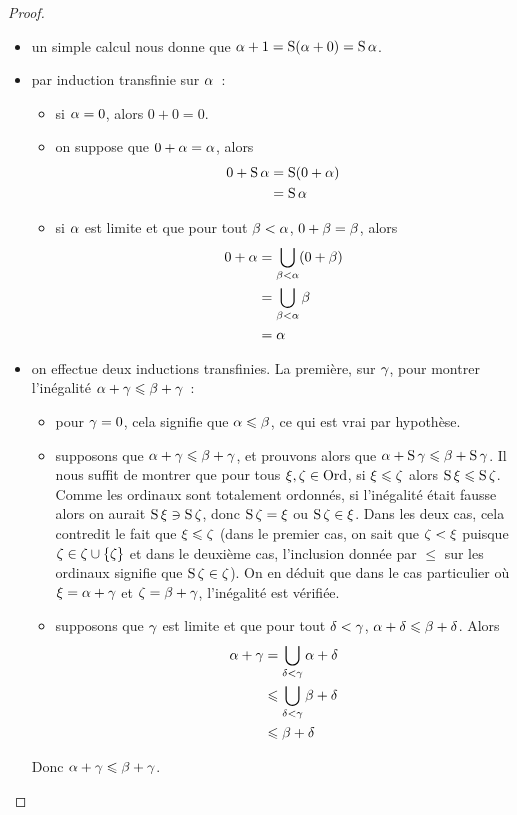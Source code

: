 \begin{proof}
\begin{itemize}
    Par contraposée, si $n \in \Ow$, alors $1 + n = n + 1 = \Ss n \neq n$,
    donc $1 + \varOa = \varOa \implies \Ow \leq \varOa$.
  \item un simple calcul nous donne que
    $\alpha + 1 = \operatorname{S}(\alpha + 0) = \operatorname{S}\alpha$.
  \item par induction transfinie sur $\alpha$~:
    \begin{itemize}
    \item si $\alpha = 0$, alors $0 + 0 = 0$.
    \item on suppose que $0 + \alpha= \alpha$, alors
      \begin{align*}
        0 + \operatorname{S}\alpha &= \operatorname{S}(0+\alpha) \\
        &= \operatorname{S}\alpha
      \end{align*}
    \item si $\alpha$ est limite et que pour tout $\beta < \alpha$,
      $0 + \beta = \beta$, alors
      \begin{align*}
        0 + \alpha &= \bigcup_{\beta < \alpha} (0 + \beta)\\
        &= \bigcup_{\beta < \alpha} \beta \\
        &= \alpha
      \end{align*}
    \end{itemize}
  \item on effectue deux inductions transfinies. La première, sur $\gamma$, pour
    montrer l'inégalité $\alpha + \gamma \leqslant \beta + \gamma$~:
    \begin{itemize}
    \item pour $\gamma = 0$, cela signifie que $\alpha \leqslant \beta$, ce qui est
      vrai par hypothèse.
    \item supposons que $\alpha + \gamma \leqslant \beta + \gamma$, et prouvons
      alors que $\alpha + \operatorname{S}\gamma \leqslant \beta + \operatorname{S}\gamma$. Il nous suffit de
      montrer que pour tous $\xi,\zeta\in\operatorname{Ord}$, si $\xi \leqslant \zeta$
      alors $\operatorname{S}\xi\leqslant\operatorname{S}\zeta$. Comme les ordinaux sont totalement
      ordonnés, si l'inégalité était fausse alors on aurait
      $\operatorname{S}\xi\ni\operatorname{S}\zeta$, donc $\operatorname{S}\zeta = \xi$ ou
      $\operatorname{S}\zeta\in \xi$. Dans les deux cas, cela contredit
      le fait que $\xi \leqslant \zeta$ (dans le premier cas, on sait que
      $\zeta < \xi$ puisque $\zeta \in \zeta \cup \{\zeta\}$ et dans le
      deuxième cas, l'inclusion donnée par $\leq$ sur les ordinaux signifie que
      $\operatorname{S}\zeta \in \zeta$). On en déduit que dans le cas particulier où
      $\xi = \alpha + \gamma$ et $\zeta = \beta + \gamma$, l'inégalité est
      vérifiée.
    \item supposons que $\gamma$ est limite et que pour tout $\delta < \gamma$,
      $\alpha + \delta \leqslant \beta + \delta$. Alors
      \begin{align*}
        \alpha + \gamma &= \bigcup_{\delta < \gamma} \alpha + \delta\\
        &\leqslant \bigcup_{\delta < \gamma} \beta + \delta \\
        &\leqslant \beta + \delta
      \end{align*}
    \end{itemize}
    Donc $\alpha + \gamma \leqslant \beta + \gamma$.


\end{itemize}
\end{proof}
